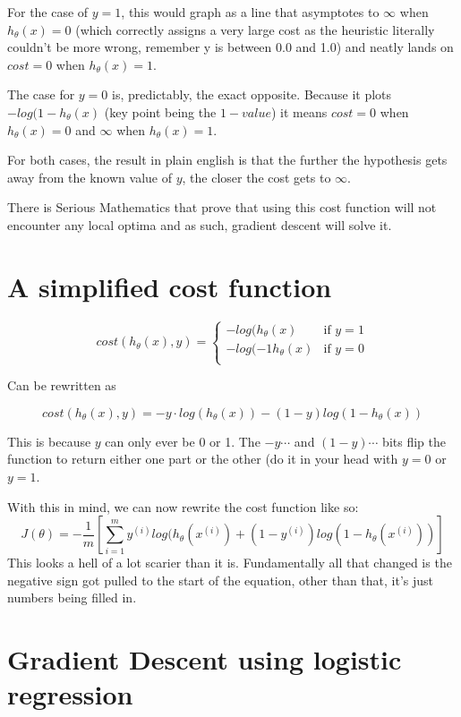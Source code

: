 For the case of $y = 1$, this would graph as a line that asymptotes to $\infty$ when $h_\theta(x) = 0$ (which correctly assigns a very large cost as the heuristic literally couldn't be more wrong, remember y is between 0.0 and 1.0) and neatly lands on $cost = 0$ when $h_\theta(x) = 1$.

The case for $y = 0$ is, predictably, the exact opposite. Because it plots $-log(1 - h_\theta(x)$ (key point being the $1 - value$) it means $cost = 0$ when $h_\theta(x) = 0$ and $\infty$ when $h_\theta(x) = 1$.

For both cases, the result in plain english is that the further the hypothesis gets away from the known value of $y$, the closer the cost gets to $\infty$.

There is Serious Mathematics that prove that using this cost function will not encounter any local optima and as such, gradient descent will solve it.

\section{A simplified cost function}

\[
cost(h_\theta(x), y) = \begin{cases}
    -log(h_\theta(x) & \text{if $y = 1$}\\
    -log(-1 h_\theta(x) & \text{if $y = 0$}\\
	\end{cases}
\]

Can be rewritten as

\begin{equation}
cost(h_\theta(x), y) = -y\cdot log(h_\theta(x)) - 
	(1 - y)log(1-h_\theta(x))
\end{equation}

This is because $y$ can only ever be 0 or 1. The $-y\cdots$ and $(1-y)\cdots$ bits flip the function to return either one part or the other (do it in your head with $y=0$ or $y=1$.

With this in mind, we can now rewrite the cost function like so:
\begin{equation}
	J(\theta) = -\frac{1}{m}[\sum^m_{i = 1}
	y^{(i)}log(h_\theta(x^{(i)}) + (1-y^{(i)})log(1-h_\theta(x^{(i)}))]
\end{equation}
This looks a hell of a lot scarier than it is. Fundamentally all that changed is the negative sign got pulled to the start of the equation, other than that, it's just numbers being filled in.

\section{Gradient Descent using logistic regression}


